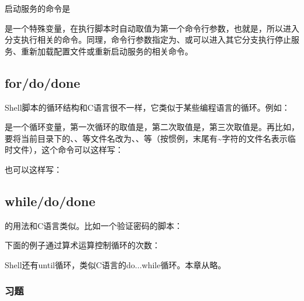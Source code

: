 启动服务的命令是




是一个特殊变量，在执行脚本时自动取值为第一个命令行参数，也就是，所以进入分支执行相关的命令。同理，命令行参数指定为、或可以进入其它分支执行停止服务、重新加载配置文件或重新启动服务的相关命令。


\subsection{for/do/done}
%


Shell脚本的循环结构和C语言很不一样，它类似于某些编程语言的循环。例如：




是一个循环变量，第一次循环的取值是，第二次取值是，第三次取值是。再比如，要将当前目录下的、、等文件名改为、、等（按惯例，末尾有\textasciitilde{}字符的文件名表示临时文件），这个命令可以这样写：




也可以这样写：



\subsection{while/do/done}
%


的用法和C语言类似。比如一个验证密码的脚本：




下面的例子通过算术运算控制循环的次数：




Shell还有until循环，类似C语言的do.\BookSplit{}.\BookSplit{}.\BookSplit{}while循环。本章从略。


\subsubsection*{习题}
%


